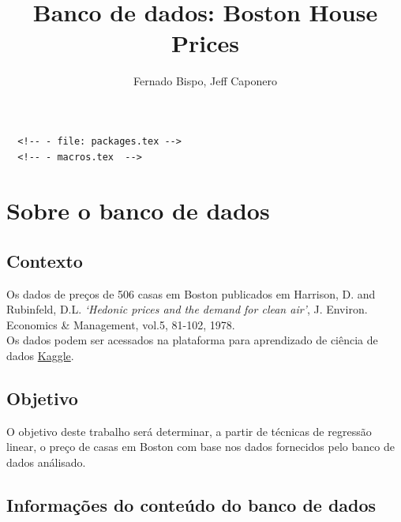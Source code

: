 \documentclass[
  letterpaper,
]{report}
\title{Banco de dados: Boston House Prices}
\author{Fernado Bispo, Jeff Caponero}
\date{}
\renewcommand*\contentsname{Índice}
\newcommand\contentsname{Índice}
\begin{document}
\maketitle
\ifdefined\Shaded\renewenvironment{Shaded}{\begin{tcolorbox}[enhanced, breakable, borderline west={3pt}{0pt}{shadecolor}, boxrule=0pt, frame hidden, sharp corners, interior hidden]}{\end{tcolorbox}}\fi

\renewcommand*\contentsname{Sumário}
{
\hypersetup{linkcolor=}
\setcounter{tocdepth}{2}
\tableofcontents
}
\begin{verbatim}
  <!-- - file: packages.tex -->
  <!-- - macros.tex  -->
\end{verbatim}

\hypertarget{sobre-o-banco-de-dados}{%
\section{Sobre o banco de dados}\label{sobre-o-banco-de-dados}}

\hypertarget{contexto}{%
\subsection{Contexto}\label{contexto}}

Os dados de preços de 506 casas em Boston publicados em Harrison, D. and
Rubinfeld, D.L. \emph{`Hedonic prices and the demand for clean air'}, J.
Environ. Economics \& Management, vol.5, 81-102, 1978.\\
Os dados podem ser acessados na plataforma para aprendizado de ciência
de dados
\href{https://www.kaggle.com/datasets/fedesoriano/the-boston-houseprice-data}{Kaggle}.

\hypertarget{objetivo}{%
\subsection{Objetivo}\label{objetivo}}

O objetivo deste trabalho será determinar, a partir de técnicas de
regressão linear, o preço de casas em Boston com base nos dados
fornecidos pelo banco de dados análisado.

\hypertarget{informauxe7uxf5es-do-conteuxfado-do-banco-de-dados}{%
\subsection{Informações do conteúdo do banco de
dados}\label{informauxe7uxf5es-do-conteuxfado-do-banco-de-dados}}
\end{document}
